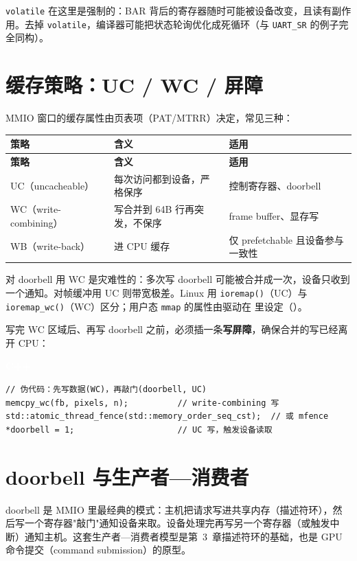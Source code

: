 \documentclass[12pt,a4paper,fontset=fandol]{ctexbook}
\newcommand{\cpplabel}{%
  \begin{tcolorbox}[enhanced,colback=cppheadbg,colframe=cppheadbg,
    arc=1mm,boxrule=0mm,left=6pt,right=6pt,top=2pt,bottom=2pt,
    halign=left,oversize]
    \textcolor{white}{\small\bfseries C++}
  \end{tcolorbox}\vspace{-4pt}}
\newcommand{\Fn}[1]{\texttt{#1()}}
\newcommand{\kw}[1]{\texttt{#1}}
\begin{document}
\kw{volatile} 在这里是强制的：BAR 背后的寄存器随时可能被设备改变，且读有副作用。去掉 \kw{volatile}，编译器可能把状态轮询优化成死循环（与 \texttt{UART\_SR} 的例子完全同构）。

\section{缓存策略：UC / WC / 屏障}\label{sec:cache-policy}

MMIO 窗口的缓存属性由页表项（PAT/MTRR）决定，常见三种：

\begin{longtable}{>{\raggedright\arraybackslash}p{2.6cm}>{\raggedright\arraybackslash}p{4.6cm}>{\raggedright\arraybackslash}p{7.5cm}}
\toprule
\textbf{策略} & \textbf{含义} & \textbf{适用} \\
\midrule
\endfirsthead
\toprule
\textbf{策略} & \textbf{含义} & \textbf{适用} \\
\midrule
\endhead
UC（uncacheable） & 每次访问都到设备，严格保序 & 控制寄存器、doorbell \\
WC（write-\allowbreak{}combining） & 写合并到 64B 行再突发，不保序 & frame buffer、显存写 \\
WB（write-back） & 进 CPU 缓存 & 仅 prefetchable 且设备参与一致性 \\
\bottomrule
\end{longtable}

对 doorbell 用 WC 是灾难性的：多次写 doorbell 可能被合并成一次，设备只收到一个通知。对帧缓冲用 UC 则带宽极差。Linux 用 \Fn{ioremap}（UC）与 \Fn{ioremap\_wc}（WC）区分；用户态 \texttt{mmap} 的属性由驱动在  里设定（）。

写完 WC 区域后、再写 doorbell 之前，必须插一条\textbf{写屏障}，确保合并的写已经离开 CPU：

\cpplabel
\begin{lstlisting}[style=cppstyle]
// 伪代码：先写数据(WC)，再敲门(doorbell, UC)
memcpy_wc(fb, pixels, n);          // write-combining 写
std::atomic_thread_fence(std::memory_order_seq_cst);  // 或 mfence
*doorbell = 1;                     // UC 写，触发设备读取
\end{lstlisting}

\section{doorbell 与生产者—消费者}\label{sec:doorbell}

doorbell 是 MMIO 里最经典的模式：主机把请求写进共享内存（描述符环），然后写一个寄存器"敲门"通知设备来取。设备处理完再写另一个寄存器（或触发中断）通知主机。这套生产者—消费者模型是第~3~章描述符环的基础，也是 GPU 命令提交（command submission）的原型。
\end{document}
